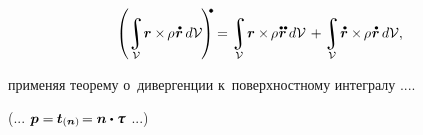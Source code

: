 \begin{otherlanguage}{russian}
\nopagebreak\vspace{-0.2em}\begin{equation*}
\displaystyle\left( \integral\displaylimits_{\mathcal{V}} \hspace{-0.4ex} \currentlocationvector \times \hspace{-0.2ex} \rho \hspace{.1ex} \mathdotabove{\currentlocationvector} \hspace{.4ex} d\mathcal{V} \hspace{-0.2ex} \right)^{\hspace{-0.3em}\tikz[baseline=-0.2ex]\draw[black, fill=black] (0,0) circle (.28ex);} \hspace{-0.1ex}
=
\integral\displaylimits_{\mathcal{V}} \hspace{-0.32ex} \currentlocationvector \times \hspace{-0.2ex} \rho \hspace{.1ex} \mathdotdotabove{\currentlocationvector} \hspace{.4ex} d\mathcal{V}
\hspace{.3ex} +
\integral\displaylimits_{\mathcal{V}} \hspace{-0.3ex} \tikzmark{RdotCrossRdotBegin} \mathdotabove{\currentlocationvector} \times \hspace{-0.2ex} \rho \hspace{.1ex} \mathdotabove{\currentlocationvector} \hspace{.1ex} \tikzmark{RdotCrossRdotEnd} \hspace{.3ex} d\mathcal{V} ,
\end{equation*}

\vspace{-0.6em}\noindent
применяя теорему о~дивергенции к~поверхностному интегралу ....

(... ${\bm{p} = \hspace{-0.1ex} \tractionvector{\currentunitnormal} \hspace{-0.1ex} = \currentunitnormal \dotp \cauchystress}$ ...)


\end{otherlanguage}

